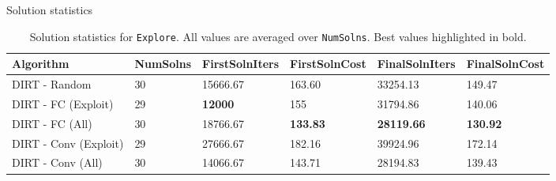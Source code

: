 \begin{columns}[t]
\begin{column}{0.68\textwidth}
\begin{block}{\large Solution statistics}
\begin{table}[]
{				\vspace{-.1in}}
			\end{table}
			\vspace{0.1in}
			\begin{table}[]
				\centering
				\begin{tabular}{|l|l|l|l|l|l|}
				\hline
				\textbf{Algorithm}    & \textbf{NumSolns} & \textbf{FirstSolnIters} & \textbf{FirstSolnCost} & \textbf{FinalSolnIters} & \textbf{FinalSolnCost} \\
				[0.5ex] \hline
				DIRT - Random         & 30                & 15666.67                & 163.60                 & 33254.13                & 149.47                 \\ \hline
				DIRT - FC (Exploit)   & 29                & \textbf{12000}                   & 155                    & 31794.86                & 140.06                 \\ \hline
				DIRT - FC (All)       & 30                & 18766.67                & \textbf{133.83}                 & \textbf{28119.66}                & \textbf{130.92}                 \\ \hline
				DIRT - Conv (Exploit) & 29                & 27666.67                & 182.16                 & 39924.96                & 172.14                 \\ \hline
				DIRT - Conv (All)     & 30                & 14066.67                & 143.71                 & 28194.83                & 139.43                 \\ \hline
				\end{tabular}
				\vspace{.1in}
				\caption{Solution statistics for \texttt{Explore}. All values are averaged over \texttt{NumSolns}. Best values highlighted in bold.}
			\end{table}
			\vspace{-.2in}


\end{block}
\end{column}
\end{columns}
